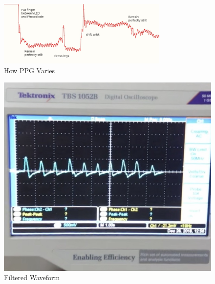\documentclass[12pt]{article}
\begin{document}
	

	\begin{figure}
		\centering
		\includegraphics[width=0.75\textwidth]{breadboardmonitorwaveform.jpg}
		\caption{How PPG Varies\cite{analomy_pulse_sensor}}
		\end{figure}


		

\label{sec:results}
\begin{figure}[!htbp]
	\centering
	\includegraphics[scale = 0.35]{res1.jpg}
	\caption{Filtered Waveform}
\end{figure}

\clearpage


\newpage
\end{document}
